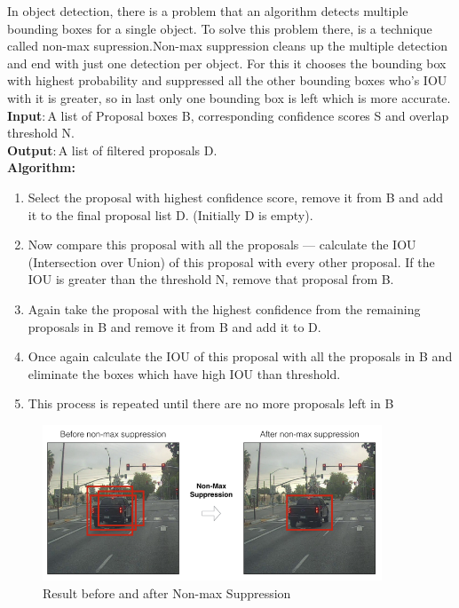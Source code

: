             In object detection, there is a problem that an algorithm detects multiple bounding boxes for a single object. To solve this problem there, is a technique called non-max supression.Non-max suppression cleans up the multiple detection and end with just one detection per object. For this it chooses the bounding box with highest probability and suppressed all the other bounding boxes who’s IOU with it is greater, so in last only one bounding box is left which is more accurate.\cite{k_2019}\\
            \textbf{Input}: A list of Proposal boxes B, corresponding confidence scores S and overlap threshold N. \\
            \textbf{Output}: A list of filtered proposals D. \\
            \textbf{Algorithm: }
            \begin{enumerate}
                \item Select the proposal with highest confidence score, remove it from B and add it to the final proposal list D. (Initially D is empty). 
                \item Now compare this proposal with all the proposals — calculate the IOU (Intersection over Union) of this proposal with every other proposal. If the IOU is greater than the threshold N, remove that proposal from B.
                \item Again take the proposal with the highest confidence from the remaining proposals in B and remove it from B and add it to D. 
                \item Once again calculate the IOU of this proposal with all the proposals in B and eliminate the boxes which have high IOU than threshold. 
                \item This process is repeated until there are no more proposals left in B 
            \end{enumerate}
            \begin{figure}[ht]
                \centering
                \includegraphics[width=0.90\textwidth]{img/NMS_1.png}
                \caption{Result before and after Non-max Suppression}
            \end{figure}

